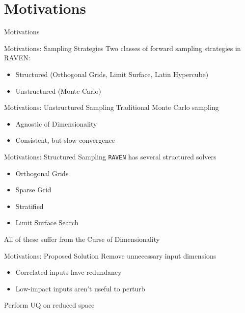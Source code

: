 \documentclass[t,9pt,svgnames]{beamer}
\newcommand{\code}[1]{\texttt{#1}}
\begin{document}
\section{Motivations}
\begin{frame}{Motivations}
\end{frame}

\begin{frame}{Motivations: Sampling Strategies}
  Two classes of forward sampling strategies in RAVEN:
  \begin{itemize}
    \item Structured (Orthogonal Grids, Limit Surface, Latin Hypercube)
    \item Unstructured (Monte Carlo)
  \end{itemize}
\end{frame}

\begin{frame}{Motivations: Unstructured Sampling}
  Traditional Monte Carlo sampling
  \begin{itemize}
    \item Agnostic of Dimensionality
    \item Consistent, but slow convergence
  \end{itemize}
\end{frame}

\begin{frame}{Motivations: Structured Sampling}
  \code{RAVEN} has several structured solvers
  \begin{itemize}
    \item Orthogonal Grids
    \item Sparse Grid
    \item Stratified
    \item Limit Surface Search
  \end{itemize}
  All of these suffer from the Curse of Dimensionality
\end{frame}

\begin{frame}{Motivations: Proposed Solution}
  Remove unnecessary input dimensions
  \begin{itemize}
    \item Correlated inputs have redundancy
    \item Low-impact inputs aren't useful to perturb
  \end{itemize}
  Perform UQ on reduced space
\end{frame}
\end{document}
